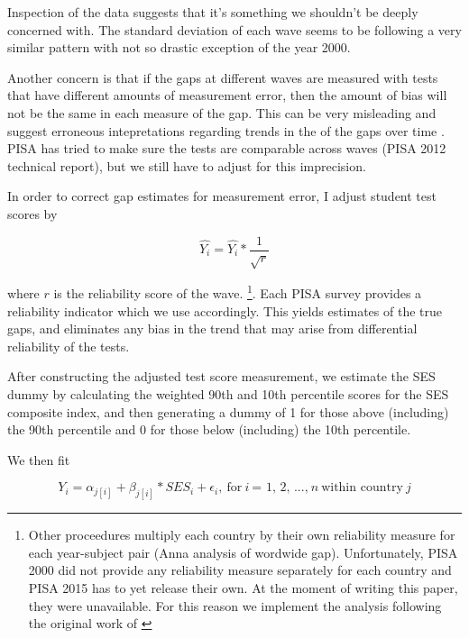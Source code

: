 \documentclass[11pt, a4paper]{article}\usepackage[]{graphicx}\usepackage[]{color}
\begin{document}


Inspection of the data suggests that it's something we shouldn't be deeply concerned with. The standard deviation of each wave seems to be following a very similar pattern with not so drastic exception of the year 2000.

Another concern is that if the gaps at different waves are measured with tests that have different amounts of measurement error, then the amount of bias will not be the same in each measure of the gap. This can be very misleading and suggest erroneous intepretations regarding trends in the of the gaps over time \citep{reardon2011}. PISA has tried to make sure the tests are comparable across waves (PISA 2012 technical report), but we still have to adjust for this imprecision.

In order to correct gap estimates for measurement error, I adjust student test scores by

\begin{equation}
\hat{Y_i} = \hat{Y_i} * \frac{1}{\sqrt{r}}
\end{equation}

where \begin{math}r\end{math} is the reliability score of the wave. \footnote{Other proceedures multiply each country by their own reliability measure for each year-subject pair (Anna analysis of wordwide gap). Unfortunately, PISA 2000 did not provide any reliability measure separately for each country and PISA 2015 has to yet release their own. At the moment of writing this paper, they were unavailable. For this reason we implement the analysis following the original work of \citet{reardon2011}}. Each PISA survey provides a reliability indicator which we use accordingly. This yields estimates of the true gaps, and eliminates any bias in the trend that may arise from differential reliability of the tests.

After constructing the adjusted test score measurement, we estimate the SES dummy by calculating the weighted 90th and 10th percentile scores for the SES composite index, and then generating a dummy of 1 for those above (including) the 90th percentile and 0 for those below (including) the 10th percentile.

We then fit

\begin{equation}
Y_i = \alpha_{j[i]} + \beta_{j[i]} * SES_i + \epsilon_i,\ \text{for} \ i \ \text{= 1, 2, ...,} \ n \ \text{within country} \ j
\end{equation}
\end{document}

